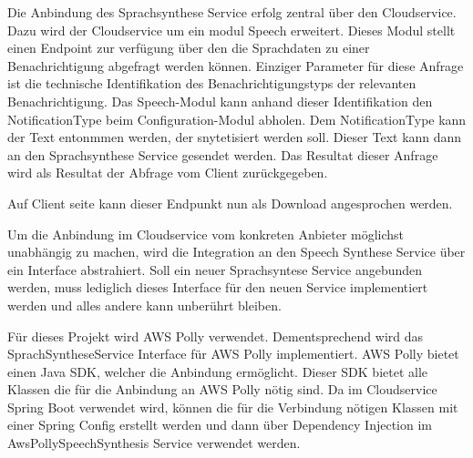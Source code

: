 Die Anbindung des Sprachsynthese Service erfolg zentral über den Cloudservice.
Dazu wird der Cloudservice um ein modul Speech erweitert.
Dieses Modul stellt einen Endpoint zur verfügung über den die Sprachdaten zu einer Benachrichtigung abgefragt werden können.
Einziger Parameter für diese Anfrage ist die technische Identifikation des Benachrichtigungstyps der relevanten Benachrichtigung.
Das Speech-Modul kann anhand dieser Identifikation den NotificationType beim Configuration-Modul abholen.
Dem NotificationType kann der Text entonmmen werden, der snytetisiert werden soll.
Dieser Text kann dann an den Sprachsynthese Service gesendet werden.
Das Resultat dieser Anfrage wird als Resultat der Abfrage vom Client zurückgegeben.



Auf Client seite kann dieser Endpunkt nun als Download angesprochen werden.



Um die Anbindung im Cloudservice vom konkreten Anbieter möglichst unabhängig zu machen, wird die Integration an den Speech Synthese Service über ein Interface abstrahiert.
Soll ein neuer Sprachsyntese Service angebunden werden, muss lediglich dieses Interface für den neuen Service implementiert werden und alles andere kann unberührt bleiben.

\clearpage



Für dieses Projekt wird AWS Polly verwendet.
Dementsprechend wird das SprachSyntheseService Interface für AWS Polly implementiert.
AWS Polly bietet einen Java SDK, welcher die Anbindung ermöglicht.
Dieser SDK bietet alle Klassen die für die Anbindung an AWS Polly nötig sind.
Da im Cloudservice Spring Boot verwendet wird, können die für die Verbindung nötigen Klassen mit einer Spring Config erstellt werden
und dann über Dependency Injection im AwsPollySpeechSynthesis Service verwendet werden.



